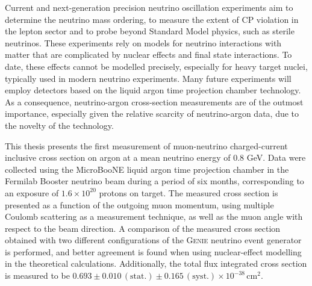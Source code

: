 Current and next-generation precision neutrino oscillation experiments aim to determine the neutrino mass ordering, to measure the extent of CP violation in the lepton sector and to probe beyond Standard Model physics, such as sterile neutrinos. These experiments rely on models for neutrino interactions with matter that are complicated by nuclear effects and final state interactions. To date, these effects cannot be modelled precisely, especially for heavy target nuclei, typically used in modern neutrino experiments. Many future experiments will employ detectors based on the liquid argon time projection chamber technology. As a consequence, neutrino-argon cross-section measurements are of the outmost importance, especially given the relative scarcity of neutrino-argon data, due to the novelty of the technology.

This thesis presents the first measurement of muon-neutrino charged-current inclusive cross section on argon at a mean neutrino energy of 0.8 GeV.
Data were collected using the MicroBooNE liquid argon time projection chamber in the Fermilab Booster neutrino beam during a period of six months, corresponding to an exposure of $1.6 \times 10^{20}$ protons on target. The measured cross section is presented as a function of the outgoing muon momentum, using multiple Coulomb scattering as a measurement technique, as well as the muon angle with respect to the beam direction. A comparison of the measured cross section obtained with two different configurations of the \textsc{Genie} neutrino event generator is performed, and better agreement is found when using nuclear-effect modelling in the theoretical calculations. Additionally, the total flux integrated cross section is measured to be $0.693 \pm 0.010 \, (\text{stat.}) \pm 0.165 \, (\text{syst.}) \times 10^{-38} \, \text{cm}^{2}$.


